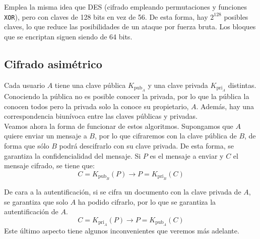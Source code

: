 Emplea la misma idea que \acrshort{DES} (cifrado empleando permutaciones y funciones \verb|XOR|), pero con claves de 128 bits en vez de 56. De esta forma, hay $2^{128}$ posibles claves, lo que reduce las posibilidades de un ataque por fuerza bruta. Los bloques que se encriptan siguen siendo de 64 bits.

\subsection{Cifrado asimétrico}
Cada usuario $A$ tiene una clave pública $K_{\text{pub}_A}$ y una clave privada $K_{\text{pri}_A}$ distintas. Conociendo la pública no es posible conocer la privada, por lo que la pública la conocen todos pero la privada solo la conoce su propietario, $A$.  Además, hay una correspondencia biunívoca entre las claves públicas y privadas.\\

Veamos ahora la forma de funcionar de estos algoritmos. Supongamos que $A$ quiere enviar un mensaje a $B$, por lo que cifraremos con la clave pública de $B$, de forma que sólo $B$ podrá descifrarlo con su clave privada. De esta forma, se garantiza la confidencialidad del mensaje. Si $P$ es el mensaje a enviar y $C$ el mensaje cifrado, se tiene que:
\begin{equation*}
    C = K_{\text{pub}_B}(P) \longrightarrow P = K_{\text{pri}_B}(C)
\end{equation*}

De cara a la autentificación, si se cifra un documento con la clave privada de $A$, se garantiza que solo $A$ ha podido cifrarlo, por lo que se garantiza la autentificación de $A$.
\begin{equation*}
    C = K_{\text{pri}_A}(P) \longrightarrow P = K_{\text{pub}_A}(C)
\end{equation*}
Este último aspecto tiene algunos inconvenientes que veremos más adelante.

